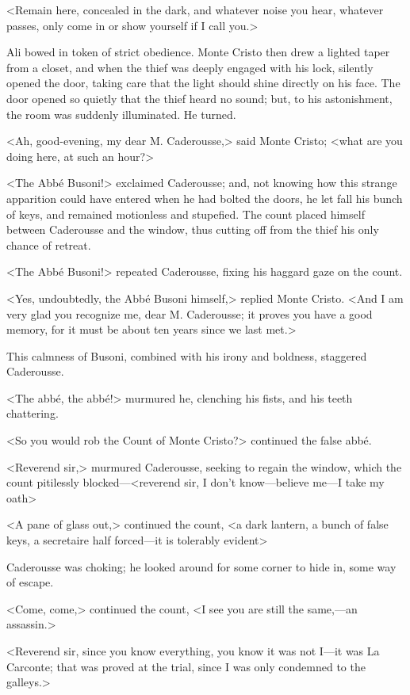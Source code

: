  <Remain here, concealed in the dark, and whatever noise you hear, whatever passes, only come in or show yourself if I call you.> 

 Ali bowed in token of strict obedience. Monte Cristo then drew a lighted taper from a closet, and when the thief was deeply engaged with his lock, silently opened the door, taking care that the light should shine directly on his face. The door opened so quietly that the thief heard no sound; but, to his astonishment, the room was suddenly illuminated. He turned. 

 <Ah, good-evening, my dear M. Caderousse,> said Monte Cristo; <what are you doing here, at such an hour?>

<The Abbé Busoni!> exclaimed Caderousse; and, not knowing how this strange apparition could have entered when he had bolted the doors, he let fall his bunch of keys, and remained motionless and stupefied. The count placed himself between Caderousse and the window, thus cutting off from the thief his only chance of retreat. 

 <The Abbé Busoni!> repeated Caderousse, fixing his haggard gaze on the count. 

 <Yes, undoubtedly, the Abbé Busoni himself,> replied Monte Cristo. <And I am very glad you recognize me, dear M. Caderousse; it proves you have a good memory, for it must be about ten years since we last met.> 

 This calmness of Busoni, combined with his irony and boldness, staggered Caderousse. 

 <The abbé, the abbé!> murmured he, clenching his fists, and his teeth chattering. 

 <So you would rob the Count of Monte Cristo?> continued the false abbé. 

 <Reverend sir,> murmured Caderousse, seeking to regain the window, which the count pitilessly blocked—<reverend sir, I don't know—believe me—I take my oath\longdash> 

 <A pane of glass out,> continued the count, <a dark lantern, a bunch of false keys, a secretaire half forced—it is tolerably evident\longdash> 

 Caderousse was choking; he looked around for some corner to hide in, some way of escape. 

 <Come, come,> continued the count, <I see you are still the same,—an assassin.> 

 <Reverend sir, since you know everything, you know it was not I—it was La Carconte; that was proved at the trial, since I was only condemned to the galleys.> 

